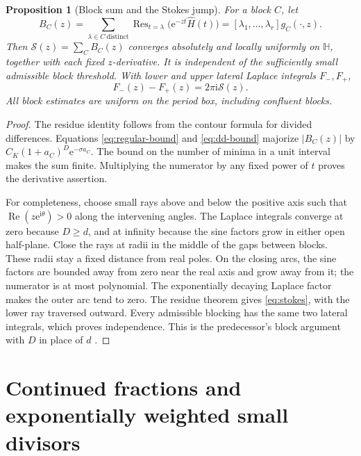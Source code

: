 \documentclass[11pt,a4paper]{article}
\numberwithin{equation}{section}
\newtheorem{proposition}[theorem]{Proposition}
\theoremstyle{definition}
\theoremstyle{remark}
\newcommand{\e}{\mathrm e}
\newcommand{\ii}{\mathrm i}
\newcommand{\Res}{\operatorname{Res}}
\newcommand{\re}{\operatorname{Re}}
\newcommand{\Hh}{\mathbb H}
\newcommand{\Ssum}{\mathcal S}
\begin{document}
\begin{proposition}[Block sum and the Stokes jump]
\label{prop:block-sum}
For a block $C$, let
\begin{equation}
 B_C(z)=\sum_{\lambda\in C\ \mathrm{distinct}}
      \Res_{t=\lambda}\bigl(\e^{-zt}\widehat H(t)\bigr)
       =[\lambda_1,\ldots,\lambda_r]g_C(\cdot,z).
 \label{eq:block-residue}
\end{equation}
Then $\Ssum(z)=\sum_C B_C(z)$ converges absolutely and locally uniformly
on $\Hh$, together with each fixed $z$-derivative. It is independent of
the sufficiently small admissible block threshold. With lower and upper
lateral Laplace integrals $F_-,F_+$,
\begin{equation}
 F_-(z)-F_+(z)=2\pi\ii\Ssum(z).
 \label{eq:stokes}
\end{equation}
All block estimates are uniform on the period box, including confluent
blocks.
\end{proposition}
\begin{proof}
The residue identity follows from the contour formula for divided
differences. Equations \eqref{eq:regular-bound} and \eqref{eq:dd-bound}
majorize $|B_C(z)|$ by $C_K(1+a_C)^D\e^{-\sigma a_C}$. The bound on the
number of minima in a unit interval makes the sum finite. Multiplying
the numerator by any fixed power of $t$ proves the derivative assertion.

For completeness, choose small rays above and below the positive axis
such that $\re(z\e^{\ii\theta})>0$ along the intervening angles.
The Laplace integrals converge at zero because $D\ge d$, and at infinity
because the sine factors grow in either open half-plane. Close the rays
at radii in the middle of the gaps between blocks. These radii stay a
fixed distance from real poles. On the closing arcs, the sine factors
are bounded away from zero near the real axis and grow away from it;
the numerator is at most polynomial. The exponentially decaying
Laplace factor makes the outer arc tend to zero. The residue theorem
gives \eqref{eq:stokes}, with the lower ray traversed outward. Every
admissible blocking has the same two lateral integrals, which proves
independence. This is the predecessor's block argument with $D$ in
place of $d$ \cite{repo-block}.
\end{proof}

\section{Continued fractions and exponentially weighted small divisors}
\label{sec:cf}
\end{document}
